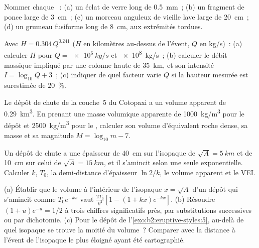 \begin{exercise}[$\star$]\label{exo:b2:eruptive-styles:2}
Nommer chaque ~: (a) un éclat de verre long de \qty{0.5}{mm}~; (b) un
fragment de ponce large de \qty{3}{cm}~; (c) un morceau anguleux de vieille lave large de \qty{20}{cm}~;
(d) un grumeau fusiforme long de \qty{8}{cm}, aux extrémités tordues.
\end{exercise}

\begin{exercise}[$\star$]\label{exo:b2:eruptive-styles:3}
Avec $H = 0.304\,Q^{0.241}$ ($H$ en kilomètres au-dessus de l'évent, $Q$ en
\unit{kg/s})~: (a) calculer $H$ pour $Q = \qty{e6}{kg/s}$ et \qty{e8}{kg/s}~;
(b) calculer le débit massique impliqué par une colonne haute de \qty{35}{km}, et son
intensité $I = \log_{10}Q + 3$~; (c) indiquer de quel facteur varie $Q$ si la hauteur mesurée
est surestimée de \qty{20}{\percent}.
\end{exercise}

\begin{exercise}[$\star$]\label{exo:b2:eruptive-styles:4}
Le dépôt de chute de la couche~5 du Cotopaxi a un volume apparent de \qty{0.29}{km^3}. En prenant une
masse volumique apparente de \qty{1000}{kg/m^3} pour le dépôt et \qty{2500}{kg/m^3} pour le
, calculer son volume d'équivalent roche dense, sa masse et sa magnitude
$M = \log_{10}m - 7$.
\end{exercise}

\begin{exercise}[$\star\star$]\label{exo:b2:eruptive-styles:5}
Un dépôt de chute a une épaisseur de \qty{40}{cm} sur l'isopaque de $\sqrt A = \qty{5}{km}$
et de \qty{10}{cm} sur celui de $\sqrt A = \qty{15}{km}$, et il s'amincit selon une seule
exponentielle. Calculer $k$, $T_0$, la demi-distance d'épaisseur $\ln 2/k$, le volume
apparent et le VEI.
\end{exercise}

\begin{exercise}[$\star\star$]\label{exo:b2:eruptive-styles:6}
(a) Établir que le volume à l'intérieur de l'isopaque $x = \sqrt A$ d'un dépôt qui s'amincit
comme $T_0e^{-kx}$ vaut $\frac{2T_0}{k^2}[1 - (1 + kx)e^{-kx}]$. (b) Résoudre $(1 + u)e^{-u} =
1/2$ à trois chiffres significatifs près, par substitutions successives ou par dichotomie. (c) Pour
le dépôt de l'\cref{exo:b2:eruptive-styles:5}, au-delà de quel isopaque se trouve la moitié du volume~? Comparer
avec la distance à l'évent de l'isopaque le plus éloigné ayant été cartographié.
\end{exercise}

